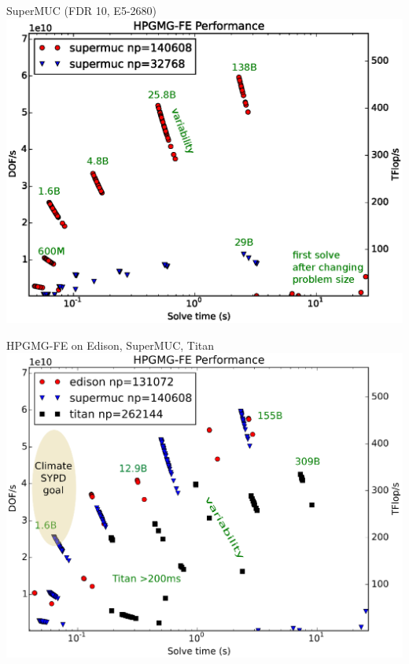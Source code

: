\documentclass{beamer}
\begin{document}
\begin{frame}{SuperMUC (FDR 10, E5-2680)}
  \includegraphics[width=\textwidth]{figures/hpgmg/range-supermuc-ann.eps}
\end{frame}

\begin{frame}{HPGMG-FE on Edison, SuperMUC, Titan}
  \includegraphics[width=\textwidth]{figures/hpgmg/range-edison-supermuc-titan-ann2.eps}
\end{frame}
\end{document}
